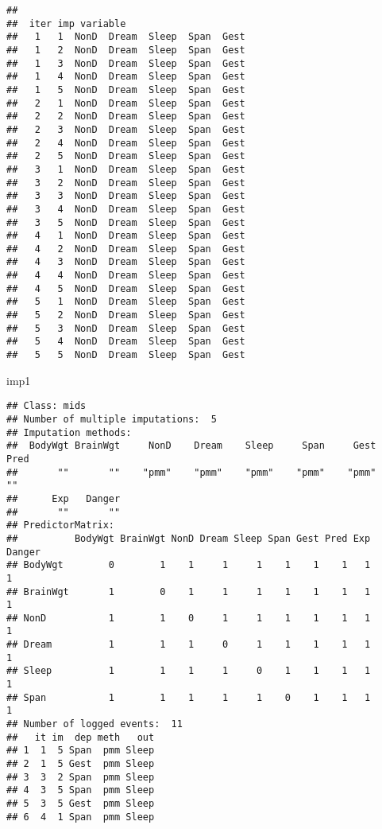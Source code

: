 \documentclass[
]{article}
\newenvironment{Shaded}{\begin{snugshade}}{\end{snugshade}}
\newcommand{\NormalTok}[1]{#1}
\begin{document}
\begin{verbatim}
## 
##  iter imp variable
##   1   1  NonD  Dream  Sleep  Span  Gest
##   1   2  NonD  Dream  Sleep  Span  Gest
##   1   3  NonD  Dream  Sleep  Span  Gest
##   1   4  NonD  Dream  Sleep  Span  Gest
##   1   5  NonD  Dream  Sleep  Span  Gest
##   2   1  NonD  Dream  Sleep  Span  Gest
##   2   2  NonD  Dream  Sleep  Span  Gest
##   2   3  NonD  Dream  Sleep  Span  Gest
##   2   4  NonD  Dream  Sleep  Span  Gest
##   2   5  NonD  Dream  Sleep  Span  Gest
##   3   1  NonD  Dream  Sleep  Span  Gest
##   3   2  NonD  Dream  Sleep  Span  Gest
##   3   3  NonD  Dream  Sleep  Span  Gest
##   3   4  NonD  Dream  Sleep  Span  Gest
##   3   5  NonD  Dream  Sleep  Span  Gest
##   4   1  NonD  Dream  Sleep  Span  Gest
##   4   2  NonD  Dream  Sleep  Span  Gest
##   4   3  NonD  Dream  Sleep  Span  Gest
##   4   4  NonD  Dream  Sleep  Span  Gest
##   4   5  NonD  Dream  Sleep  Span  Gest
##   5   1  NonD  Dream  Sleep  Span  Gest
##   5   2  NonD  Dream  Sleep  Span  Gest
##   5   3  NonD  Dream  Sleep  Span  Gest
##   5   4  NonD  Dream  Sleep  Span  Gest
##   5   5  NonD  Dream  Sleep  Span  Gest
\end{verbatim}

\begin{Shaded}
\begin{Highlighting}[]
\NormalTok{imp1}
\end{Highlighting}
\end{Shaded}

\begin{verbatim}
## Class: mids
## Number of multiple imputations:  5 
## Imputation methods:
##  BodyWgt BrainWgt     NonD    Dream    Sleep     Span     Gest     Pred 
##       ""       ""    "pmm"    "pmm"    "pmm"    "pmm"    "pmm"       "" 
##      Exp   Danger 
##       ""       "" 
## PredictorMatrix:
##          BodyWgt BrainWgt NonD Dream Sleep Span Gest Pred Exp Danger
## BodyWgt        0        1    1     1     1    1    1    1   1      1
## BrainWgt       1        0    1     1     1    1    1    1   1      1
## NonD           1        1    0     1     1    1    1    1   1      1
## Dream          1        1    1     0     1    1    1    1   1      1
## Sleep          1        1    1     1     0    1    1    1   1      1
## Span           1        1    1     1     1    0    1    1   1      1
## Number of logged events:  11 
##   it im  dep meth   out
## 1  1  5 Span  pmm Sleep
## 2  1  5 Gest  pmm Sleep
## 3  3  2 Span  pmm Sleep
## 4  3  5 Span  pmm Sleep
## 5  3  5 Gest  pmm Sleep
## 6  4  1 Span  pmm Sleep
\end{verbatim}
\end{document}

